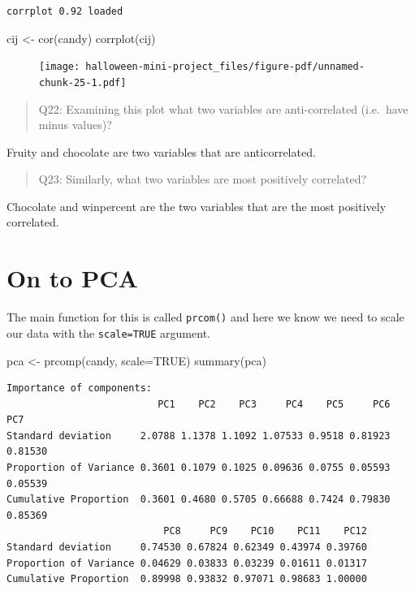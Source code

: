 \documentclass[
  letterpaper,
  DIV=11,
  numbers=noendperiod]{scrartcl}
\newenvironment{Shaded}{\begin{snugshade}}{\end{snugshade}}
\newcommand{\AttributeTok}[1]{\textcolor[rgb]{0.40,0.45,0.13}{#1}}
\newcommand{\ConstantTok}[1]{\textcolor[rgb]{0.56,0.35,0.01}{#1}}
\newcommand{\FunctionTok}[1]{\textcolor[rgb]{0.28,0.35,0.67}{#1}}
\newcommand{\NormalTok}[1]{\textcolor[rgb]{0.00,0.23,0.31}{#1}}
\newcommand{\OtherTok}[1]{\textcolor[rgb]{0.00,0.23,0.31}{#1}}
\begin{document}
\begin{verbatim}
corrplot 0.92 loaded
\end{verbatim}

\begin{Shaded}
\begin{Highlighting}[]
\NormalTok{cij }\OtherTok{\textless{}{-}} \FunctionTok{cor}\NormalTok{(candy)}
\FunctionTok{corrplot}\NormalTok{(cij)}
\end{Highlighting}
\end{Shaded}

\begin{figure}[H]

{\centering \texttt{[image: halloween-mini-project\_files/figure-pdf/unnamed-chunk-25-1.pdf]}

}

\end{figure}

\begin{quote}
Q22: Examining this plot what two variables are anti-correlated
(i.e.~have minus values)?
\end{quote}

Fruity and chocolate are two variables that are anticorrelated.

\begin{quote}
Q23: Similarly, what two variables are most positively correlated?
\end{quote}

Chocolate and winpercent are the two variables that are the most
positively correlated.

\hypertarget{on-to-pca}{%
\section{On to PCA}\label{on-to-pca}}

The main function for this is called \texttt{prcom()} and here we know
we need to scale our data with the \texttt{scale=TRUE} argument.

\begin{Shaded}
\begin{Highlighting}[]
\NormalTok{pca }\OtherTok{\textless{}{-}} \FunctionTok{prcomp}\NormalTok{(candy, }\AttributeTok{scale=}\ConstantTok{TRUE}\NormalTok{)}
\FunctionTok{summary}\NormalTok{(pca)}
\end{Highlighting}
\end{Shaded}

\begin{verbatim}
Importance of components:
                          PC1    PC2    PC3     PC4    PC5     PC6     PC7
Standard deviation     2.0788 1.1378 1.1092 1.07533 0.9518 0.81923 0.81530
Proportion of Variance 0.3601 0.1079 0.1025 0.09636 0.0755 0.05593 0.05539
Cumulative Proportion  0.3601 0.4680 0.5705 0.66688 0.7424 0.79830 0.85369
                           PC8     PC9    PC10    PC11    PC12
Standard deviation     0.74530 0.67824 0.62349 0.43974 0.39760
Proportion of Variance 0.04629 0.03833 0.03239 0.01611 0.01317
Cumulative Proportion  0.89998 0.93832 0.97071 0.98683 1.00000
\end{verbatim}
\end{document}
